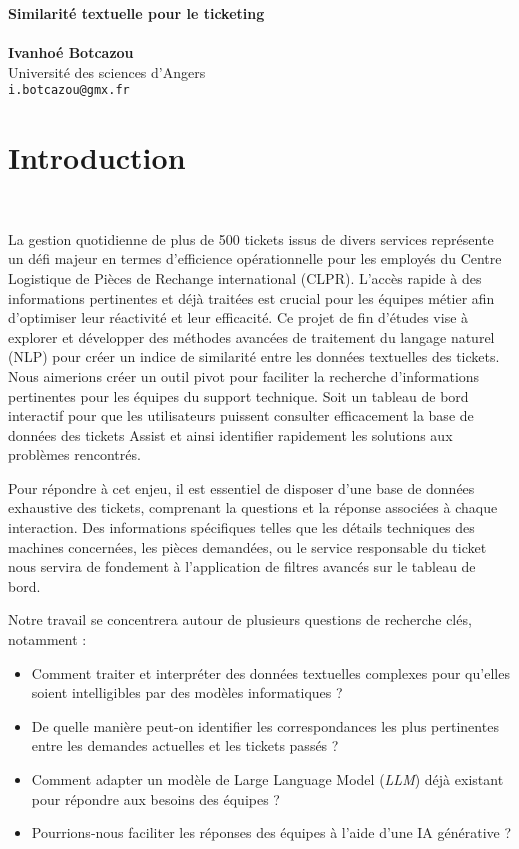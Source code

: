 \documentclass[12pt]{article}
\makeatletter
\newcommand{\titlePage}{
		\begin{center}
			\noindent\makebox[\linewidth]{\rule{\textwidth}{4pt}} 
			\Huge\textbf{\sc Similarité textuelle pour le ticketing}\\[-0.25cm]
			\noindent\makebox[\linewidth]{\rule{\textwidth}{2pt}} 
			\hfill\\[1cm]
			\vspace*{4pt}
			\large \textbf{Ivanhoé Botcazou}\\
			\large Université des sciences d'Angers \\
			\texttt{i.botcazou@gmx.fr}\\[2cm]
		\end{center}
}
\theoremstyle{definition}
\makeatother
\begin{document}
	
	\titlePage %
	\tableofcontents
	\newpage 
	\section{Introduction}\quad\\[-0.5cm]
	
	 \par La gestion quotidienne de plus de 500 tickets issus de divers services représente un défi majeur en termes d'efficience opérationnelle pour les employés du Centre Logistique de Pièces de Rechange international (CLPR). L'accès rapide à des informations pertinentes et déjà traitées est crucial pour les équipes métier afin d'optimiser leur réactivité et leur efficacité. Ce projet de fin d'études vise à explorer et développer des méthodes avancées de traitement du langage naturel (NLP) pour créer un indice de similarité entre les données textuelles des tickets. Nous aimerions créer un outil pivot pour faciliter la recherche d'informations pertinentes pour les équipes du support technique. Soit un tableau de bord interactif pour que les utilisateurs puissent consulter efficacement la base de données des tickets Assist et ainsi identifier rapidement les solutions aux problèmes rencontrés.
	
	Pour répondre à cet enjeu, il est essentiel de disposer d'une base de données exhaustive des tickets, comprenant la questions et la réponse associées à chaque interaction. Des informations spécifiques telles que les détails techniques des machines concernées, les pièces demandées, ou le service responsable du ticket nous servira de fondement à l'application de filtres avancés sur le tableau de bord.
	
	Notre travail se concentrera autour de plusieurs questions de recherche clés, notamment : 
		\begin{itemize}[-]
		\item Comment traiter et interpréter des données textuelles complexes pour qu'elles soient intelligibles par des modèles informatiques ? 
		\item De quelle manière peut-on identifier les correspondances les plus pertinentes entre les demandes actuelles et les tickets passés ? 
		\item Comment adapter un modèle de Large Language Model (\emph{LLM}) déjà existant pour répondre aux besoins des équipes ? 
		\item Pourrions-nous faciliter les réponses des équipes à l'aide d'une IA générative ? 
	\end{itemize}
	
\end{document}
